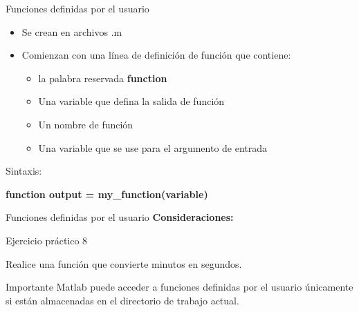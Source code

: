 \documentclass{bredelebeamer}
\begin{document}
\begin{frame}{Funciones definidas por el usuario}
\begin{itemize}
\item Se crean en archivos .m
\item Comienzan con una línea de definición de función que contiene:
\begin{itemize}
\item la palabra reservada \textbf{function}
\item Una variable que defina la salida de función
\item Un nombre de función
\item Una variable que se use para el argumento de entrada
\end{itemize}
\end{itemize}
Sintaxis:
\begin{center}
\textbf{function output = my\_function(variable)}
\end{center}
\end{frame}

\begin{frame}{Funciones definidas por el usuario}
\textbf{Consideraciones:}
\end{frame}

\begin{frame}{Ejercicio práctico 8}
\begin{center}
Realice una función que convierte minutos en segundos.
\end{center}
\begin{alertblock}{Importante}
Matlab puede acceder a funciones definidas por el usuario únicamente si están almacenadas en el directorio de trabajo actual.
\end{alertblock}
\end{frame}
\end{document}
